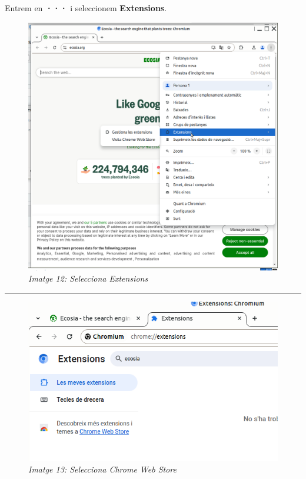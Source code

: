 \documentclass[
  a4paper,
]{article}
\begin{document}
Entrem en \textbf{···} i seleccionem \textbf{Extensions}.

\begin{figure}
\centering
\includegraphics{png/1-ChromeExtensions.png}
\caption{\emph{Imatge 12: Selecciona Extensions}}
\end{figure}

\begin{center}\rule{0.5\linewidth}{0.5pt}\end{center}

\begin{figure}
\centering
\includegraphics{png/2-ChromeExtensions.png}
\caption{\emph{Imatge 13: Selecciona Chrome Web Store}}
\end{figure}
\end{document}
